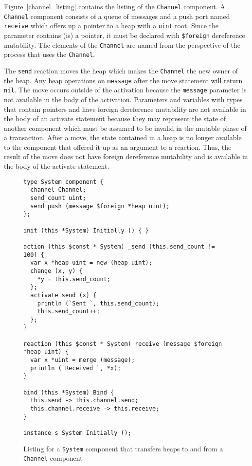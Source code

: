 Figure~\ref{channel_listing} contains the listing of the \verb+Channel+ component.
A \verb+Channel+ component consists of a queue of messages and a push port named \verb+receive+ which offers up a pointer to a heap with a \verb+uint+ root.
Since the parameter contains (is) a pointer, it must be declared with \verb+$foreign+ dereference mutability.
The elements of the \verb+Channel+ are named from the perspective of the process that uses the \verb+Channel+.

The \verb+send+ reaction moves the heap which makes the \verb+Channel+ the new owner of the heap.
Any heap operations on \verb+message+ after the move statement will return \verb+nil+.
The move occurs outside of the activation because the \verb+message+ parameter is not available in the body of the activation.
Parameters and variables with types that contain pointers and have foreign dereference mutability are not available in the body of an activate statement because they may represent the state of another component which must be assumed to be invalid in the mutable phase of a transaction.
After a move, the state contained in a heap is no longer available to the component that offered it up as an argument to a reaction.
Thus, the result of the move does not have foreign dereference mutability and is available in the body of the activate statement.

\begin{figure}
\begin{verbatim}
type System component {
  channel Channel;
  send_count uint;
  send push (message $foreign *heap uint);
};

init (this *System) Initially () { }

action (this $const * System) _send (this.send_count != 100) {
  var x *heap uint = new (heap uint);
  change (x, y) {
    *y = this.send_count;
  };
  activate send (x) {
    println (`Sent `, this.send_count);
    this.send_count++;
  };
}

reaction (this $const * System) receive (message $foreign *heap uint) {
  var x *uint = merge (message);
  println (`Received `, *x);
}

bind (this *System) Bind {
  this.send -> this.channel.send;
  this.channel.receive -> this.receive;
}

instance s System Initially ();
\end{verbatim}
\cprotect\caption{Listing for a \verb+System+ component that transfers heaps to and from a \verb+Channel+ component\label{channel_system_listing}}
\end{figure}

